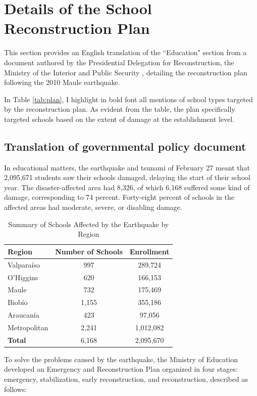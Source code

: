 \section{Details of the School Reconstruction Plan}\label{sec:reconstructionplan}
This section provides an English translation of the ``Education" section from a document authored by the Presidential Delegation for Reconstruction, the Ministry of the Interior and Public Security \citep{Gobierno2010}, detailing the reconstruction plan following the 2010 Maule earthquake.\par 

In Table \ref{tab:plan}, I highlight in bold font all mentions of school types targeted by the reconstruction plan. As evident from the table, the plan specifically targeted schools based on the extent of damage at the establishment level.


\subsection*{Translation of governmental policy document}

In educational matters, the earthquake and tsunami of February 27 meant that 2,095,671 students saw their schools damaged, delaying the start of their school year. The disaster-affected area had 8,326, of which 6,168 suffered some kind of damage, corresponding to 74 percent. Forty-eight percent of schools in the affected areas had moderate, severe, or disabling damage.

\begin{table}[H]
\centering
\caption{Summary of Schools Affected by the Earthquake by Region}
\begin{tabular}{|l|c|c|}
\hline
\textbf{Region} & \textbf{Number of Schools} & \textbf{Enrollment} \\
\hline
Valparaíso & 997 & 289,724 \\
O'Higgins & 620 & 166,153 \\
Maule & 732 & 175,469 \\
Biobío & 1,155 & 355,186 \\
Araucanía & 423 & 97,056 \\
Metropolitan & 2,241 & 1,012,082 \\
\hline
\textbf{Total} & 6,168 & 2,095,670 \\
\hline
\end{tabular}
\end{table}

To solve the problems caused by the earthquake, the Ministry of Education developed an Emergency and Reconstruction Plan organized in four stages: emergency, stabilization, early reconstruction, and reconstruction, described as follows:


